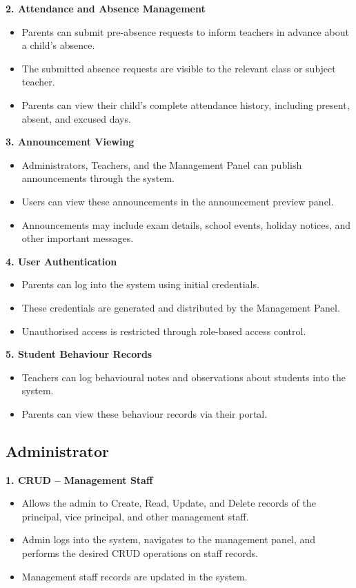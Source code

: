 \documentclass[12pt, a4paper]{report}
\begin{document}
\textbf{2. Attendance and Absence Management}
\begin{itemize}
    \item Parents can submit pre-absence requests to inform teachers in advance about a child's absence.
    \item The submitted absence requests are visible to the relevant class or subject teacher.
    \item Parents can view their child's complete attendance history, including present, absent, and excused days.
\end{itemize}

\textbf{3. Announcement Viewing}
\begin{itemize}
    \item Administrators, Teachers, and the Management Panel can publish announcements through the system.
    \item Users can view these announcements in the announcement preview panel.
    \item Announcements may include exam details, school events, holiday notices, and other important messages.
\end{itemize}

\textbf{4. User Authentication}
\begin{itemize}
    \item Parents can log into the system using initial credentials.
    \item These credentials are generated and distributed by the Management Panel.
    \item Unauthorised access is restricted through role-based access control.
\end{itemize}

\textbf{5. Student Behaviour Records}
\begin{itemize}
    \item Teachers can log behavioural notes and observations about students into the system.
    \item Parents can view these behaviour records via their portal.
\end{itemize}

\subsection{Administrator}

\textbf{1. CRUD -- Management Staff}
\begin{itemize}
    \item Allows the admin to Create, Read, Update, and Delete records of the principal, vice principal, and other management staff.
    \item Admin logs into the system, navigates to the management panel, and performs the desired CRUD operations on staff records.
    \item Management staff records are updated in the system.
\end{itemize}
\end{document}
